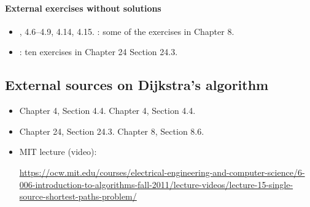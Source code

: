 \paragraph{External exercises without solutions}

\begin{itemize}
\item {}, 4.6--4.9, 4.14, 4.15.  \JE: some of the exercises in Chapter 8.
\item \CLRS: ten exercises in Chapter 24 Section 24.3.
\end{itemize}


\subsection{External sources on Dijkstra's algorithm}

\begin{itemize}

\item \KT Chapter 4, Section 4.4.  \DPV Chapter 4, Section 4.4.
\item \CLRS Chapter 24, Section 24.3. \JE Chapter 8, Section 8.6.

\item MIT lecture (video): 

  \parbox{5in}{  
\url{https://ocw.mit.edu/courses/electrical-engineering-and-computer-science/6-006-introduction-to-algorithms-fall-2011/lecture-videos/lecture-15-single-source-shortest-paths-problem/}}

\end{itemize}




